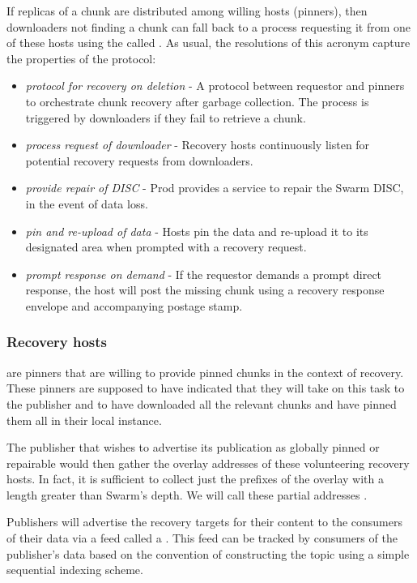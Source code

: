 If replicas of a chunk are distributed among willing hosts (pinners), then downloaders not finding a chunk can fall back to a  process requesting it from one of these hosts using the  called .
As usual, the resolutions of this acronym capture the properties of the protocol:

\begin{itemize}[noitemsep]
\item \emph{protocol for recovery on deletion} - A protocol between requestor and pinners to orchestrate chunk recovery after garbage collection. The process is triggered by downloaders if they fail to retrieve a chunk.
\item \emph{process request of downloader} - Recovery hosts continuously listen for potential recovery requests from downloaders.
\item \emph{provide repair of DISC} - 
Prod provides a service to repair the Swarm DISC, in the event of data loss.
\item \emph{pin and re-upload of data} -     
Hosts pin the data and re-upload it to its designated area when prompted with a recovery request. 
\item \emph{prompt response on demand}  - If the requestor demands a prompt direct response, the host will post the missing chunk using a recovery response envelope and accompanying postage stamp.
\end{itemize}

\subsubsection{Recovery hosts}

 are pinners that are willing to provide pinned chunks in the context of recovery. These pinners are supposed to have indicated that they will take on this task to the publisher and to have downloaded all the relevant chunks and have pinned them all in their local instance. 

The publisher that wishes to advertise its publication as globally pinned or repairable would then gather the overlay addresses of these volunteering recovery hosts. In fact, it is sufficient to collect just the prefixes of the overlay with a length greater than Swarm's depth. We will call these partial addresses .

Publishers will advertise the recovery targets for their content to the consumers of their data via a feed called a . This feed can be tracked by consumers of the publisher's data based on the convention of constructing the topic using a simple sequential indexing scheme. 

